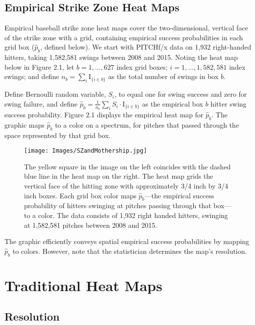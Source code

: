 \subsection{Empirical Strike Zone Heat Maps}

Empirical baseball strike zone heat maps cover the two-dimensional, vertical face of the strike zone with a grid, containing empirical success probabilities  in each grid box ($\hat{p}_{b}$, defined below).  We start with PITCHf/x\textsuperscript{\textregistered} data on 1,932 right-handed hitters, taking 1,582,581 swings between 2008 and 2015.  Noting the heat map below in Figure 2.1, let $b = 1, \dots, 627$ index grid boxes; $i = 1, \dots, 1,582,581$ index swings; and define $n_{b} = \displaystyle\sum_{i} \text{I}_{\{i \in b \}}$ as the total number of swings in box $b$.

Define Bernoulli random variable, $S_{i}$, to equal one for swing success and zero for swing failure, and define $\hat{p}_{b} = \frac{1}{n_{b}} \displaystyle\sum_{i} S_{i} \cdot \text{I}_{\{i \in b \}}$ as the empirical box $b$ hitter swing success probability. Figure 2.1 displays the empirical heat map for $\hat{p}_{b}$. The graphic maps $\hat{p}_{b}$ to a color on a spectrum, for pitches that passed through the space represented by that grid box.
  \begin{figure}[H]
	\centering
	\texttt{[image: Images/SZandMothership.jpg]} 
  \caption{The yellow square in the image on the left coincides with the dashed blue line in the heat map on the right. The heat map grids the vertical face of the hitting zone with approximately 3/4 inch by 3/4 inch boxes. Each grid box color maps $\hat{p}_{b}$---the empirical success probability of hitters swinging at pitches passing through that box---to a color.  The data consists of 1,932 right handed hitters, swinging at 1,582,581 pitches between 2008 and 2015.}
	\end{figure} 
The graphic efficiently conveys spatial empirical success probabilities by mapping $\hat{p}_{b}$ to colors. However, note that the statistician determines the map's resolution.

\section{Traditional Heat Maps}

\subsection{Resolution} %

